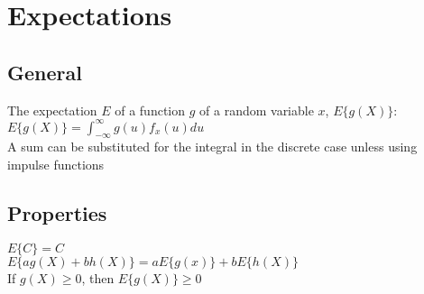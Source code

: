 \section*{Expectations}
\subsection*{General}
The expectation $E$ of a function $g$ of a random variable $x$, $E\{g(X)\}$: \\
$E\{g(X)\}=\int_{-\infty}^{\infty}g(u)f_x(u)du$ \\
A sum can be substituted for the integral in the discrete case unless using impulse functions

\subsection*{Properties}
$E\{C\}=C$ \\
$E\{ag(X)+bh(X)\}=aE\{g(x)\}+bE\{h(X)\}$ \\
If $g(X)\geq 0$, then $E\{g(X)\} \geq 0$


    


